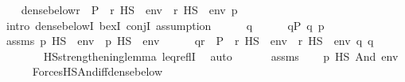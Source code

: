 \begin{isabellebody}
\ \ \isamarkupfalse%
\ {\isachardoublequoteopen}dense{\isacharunderscore}{\kern0pt}below{\isacharparenleft}{\kern0pt}{\isacharbraceleft}{\kern0pt}r\ {\isasymin}\ P\ {\isachardot}{\kern0pt}\ {\isacharparenleft}{\kern0pt}r\ {\isasymtturnstile}HS\ {\isasymphi}\ env{\isacharparenright}{\kern0pt}\ {\isasymand}\ {\isacharparenleft}{\kern0pt}r\ {\isasymtturnstile}HS\ {\isasympsi}\ env{\isacharparenright}{\kern0pt}{\isacharbraceright}{\kern0pt}{\isacharcomma}{\kern0pt}\ p{\isacharparenright}{\kern0pt}{\isachardoublequoteclose}\isanewline
\ \ \isamarkupfalse%
\ {\isacharparenleft}{\kern0pt}intro\ dense{\isacharunderscore}{\kern0pt}belowI\ bexI\ conjI{\isacharcomma}{\kern0pt}\ assumption{\isacharparenright}{\kern0pt}\isanewline
\ \ \ \ \isamarkupfalse%
\ q\isanewline
\ \ \ \ \isamarkupfalse%
\ {\isachardoublequoteopen}q{\isasymin}P{\isachardoublequoteclose}\ {\isachardoublequoteopen}q{\isasympreceq}\ p{\isachardoublequoteclose}\isanewline
\ \ \ \ \isamarkupfalse%
\ assms\ {\isacartoucheopen}{\isacharparenleft}{\kern0pt}p\ {\isasymtturnstile}HS\ {\isasymphi}\ env{\isacharparenright}{\kern0pt}\ {\isasymand}\ {\isacharparenleft}{\kern0pt}p\ {\isasymtturnstile}HS\ {\isasympsi}\ env{\isacharparenright}{\kern0pt}{\isacartoucheclose}\isanewline
\ \ \ \ \isamarkupfalse%
\ {\isachardoublequoteopen}q{\isasymin}{\isacharbraceleft}{\kern0pt}r\ {\isasymin}\ P\ {\isachardot}{\kern0pt}\ {\isacharparenleft}{\kern0pt}r\ {\isasymtturnstile}HS\ {\isasymphi}\ env{\isacharparenright}{\kern0pt}\ {\isasymand}\ {\isacharparenleft}{\kern0pt}r\ {\isasymtturnstile}HS\ {\isasympsi}\ env{\isacharparenright}{\kern0pt}{\isacharbraceright}{\kern0pt}{\isachardoublequoteclose}\ {\isachardoublequoteopen}q{\isasympreceq}\ q{\isachardoublequoteclose}\isanewline
\ \ \ \ \ \ \isamarkupfalse%
\ HS{\isacharunderscore}{\kern0pt}strengthening{\isacharunderscore}{\kern0pt}lemma\ leq{\isacharunderscore}{\kern0pt}reflI\ \isamarkupfalse%
\ auto\isanewline
\ \ \isamarkupfalse%
\isanewline
\ \ \isamarkupfalse%
\ assms\isanewline
\ \ \isamarkupfalse%
\ {\isachardoublequoteopen}p\ {\isasymtturnstile}HS\ And{\isacharparenleft}{\kern0pt}{\isasymphi}{\isacharcomma}{\kern0pt}{\isasympsi}{\isacharparenright}{\kern0pt}\ env{\isachardoublequoteclose}\isanewline
\ \ \ \ \isamarkupfalse%
\ ForcesHS{\isacharunderscore}{\kern0pt}And{\isacharunderscore}{\kern0pt}iff{\isacharunderscore}{\kern0pt}dense{\isacharunderscore}{\kern0pt}below\ \isamarkupfalse%

\end{isabellebody}
